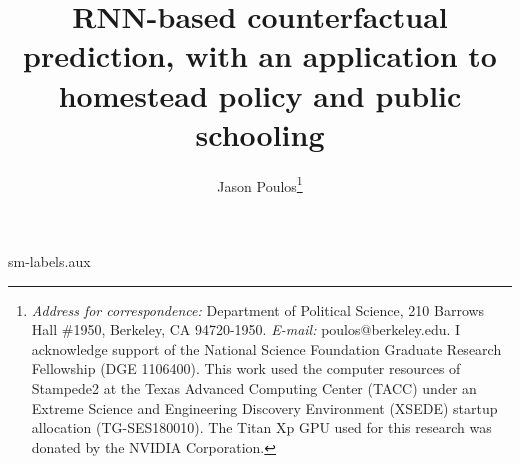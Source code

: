 \begin{filecontents*}{sm-labels.aux}
\end{filecontents*}

\documentclass[hidelinks,12pt]{article}

\usepackage{hyperref, url} 
\usepackage{graphicx,amsfonts,psfrag,layout,subcaption,array,longtable,lscape,booktabs,dcolumn,amsmath,amssymb,amssymb,amsthm,setspace,epigraph,chronology,color,colortbl,wasysym,diagbox,natbib,colortbl,authblk,commath,upgreek}
\usepackage[]{graphicx}\usepackage[]{color}
\usepackage[page]{appendix}
\usepackage[section]{placeins}
\usepackage[linewidth=1pt]{mdframed}
\usepackage[margin={1in}]{geometry} %

\title{RNN-based counterfactual prediction, with an application to homestead policy and public schooling} 
\author[ ]{Jason Poulos\thanks{\emph{Address for correspondence:} Department of Political Science, 210 Barrows Hall \#1950, Berkeley, CA 94720-1950. \emph{E-mail:} poulos@berkeley.edu. I acknowledge support of the National Science Foundation Graduate Research Fellowship (DGE 1106400). This work used the computer resources of Stampede2 at the Texas Advanced Computing Center (TACC) under an Extreme Science and Engineering Discovery Environment (XSEDE) startup allocation (TG-SES180010). The Titan Xp GPU used for this research was donated by the NVIDIA Corporation.}}
\date{}
\setcounter{Maxaffil}{0}
\renewcommand\Affilfont{\itshape\small}

\renewcommand{\abstractname}{Summary} %

\usepackage[autosize]{dot2texi}
\usepackage{tikz}
\usetikzlibrary{shapes,arrows}

\usepackage{xr}


\usepackage[bottom]{footmisc}

